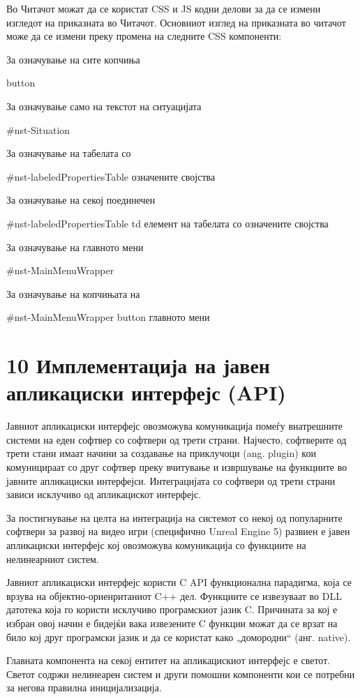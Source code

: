 Во Читачот можат да се користат CSS и JS кодни делови за да се измени изгледот на приказната во Читачот. Основниот изглед на приказната во читачот може да се измени преку промена на следните CSS компоненти:

За означување на сите копчиња

button

За означување само на текстот на ситуацијата

\#nst-Situation

За означување на табелата со

\#nst-labeledPropertiesTable означените својства

За означување на секој поединечен

\#nst-labeledPropertiesTable td елемент на табелата со означените својства

За означување на главното мени

\#nst-MainMenuWrapper

За означување на копчињата на

\#nst-MainMenuWrapper button главното мени

\section{10 Имплементација на јавен апликациски интерфејс (API)}


Јавниот апликациски интерфејс овозможува комуникација помеѓу внатрешните системи на еден софтвер со софтвери од трети страни. Најчесто, софтверите од трети стани имаат начини за создавање на приклучоци (ang. plugin) кои комуницираат со друг софтвер преку вчитување и извршување на функциите во јавните апликациски интерфејси. Интеграцијата со софтвери од трети страни зависи исклучиво од апликацискот интерфејс.

За постигнување на целта на интеграција на системот со некој од популарните софтвери за развој на видео игри (специфично Unreal Engine 5) развиен е јавен апликациски интерфејс кој овозможува комуникација со функциите на нелинеарниот систем.

Јавниот апликациски интерфејс користи C API функционална парадигма, која се врзува на објектно-ориенританиот C++ дел. Функциите се извезуваат во DLL датотека која го користи исклучиво програмскиот јазик C. Причината за кој е избран овој начин е бидејќи вака извезените C функции можат да се врзат на било кој друг програмски јазик и да се користат како „домородни“ (анг. native).

Главната компонента на секој ентитет на апликацискиот интерфејс е светот. Светот содржи нелинеарен систем и други помошни компоненти кои се потребни за негова правилна иницијализација.

